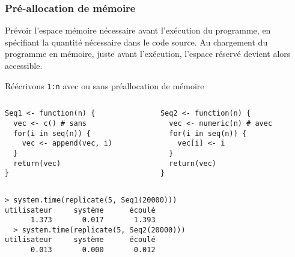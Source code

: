 \documentclass[10pt]{beamer}
\begin{document}
\begin{frame}[fragile]
  \frametitle{Pré-allocation de mémoire}
    Prévoir l’espace mémoire nécessaire avant l’exécution du programme, en spécifiant la quantité nécessaire dans le code source.
  Au chargement du programme en mémoire, juste avant l’exécution, l’espace réservé devient alors accessible.


  \begin{exampleblock}{Réécrivons \texttt{1:n} avec ou sans préallocation de mémoire}
\begin{columns}[t]
\begin{column}{0.48\textwidth}
  \begin{lstlisting}[style=editor]
Seq1 <- function(n) {
  vec <- c() # sans
  for(i in seq(n)) {
    vec <- append(vec, i)
  }
  return(vec)
}
\end{lstlisting}
\end{column}
\begin{column}{0.48\textwidth}
  \begin{lstlisting}[style=editor]
Seq2 <- function(n) {
  vec <- numeric(n) # avec
  for(i in seq(n)) {
    vec[i] <- i
  }
  return(vec)
}
\end{lstlisting}
\end{column}
\end{columns}
\smallskip
\begin{lstlisting}
> system.time(replicate(5, Seq1(20000)))
utilisateur     système      écoulé 
      1.373       0.017       1.393   
  > system.time(replicate(5, Seq2(20000)))
utilisateur     système      écoulé 
      0.013       0.000       0.012   
\end{lstlisting}
\end{exampleblock}
  
\end{frame}
\end{document}
